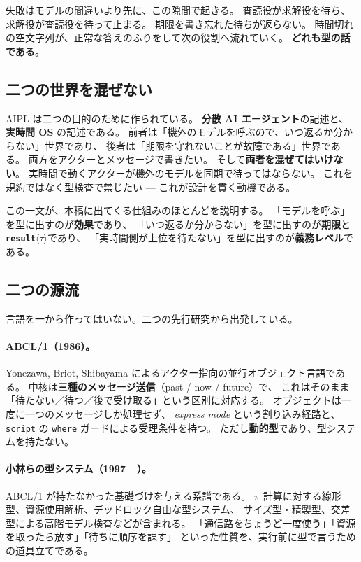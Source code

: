 \documentclass[11pt,a4paper]{ltjsarticle}
\theoremstyle{definition}
\theoremstyle{remark}
\begin{document}
失敗はモデルの間違いより先に、この隙間で起きる。
査読役が求解役を待ち、求解役が査読役を待って止まる。
期限を書き忘れた待ちが返らない。
時間切れの空文字列が、正常な答えのふりをして次の役割へ流れていく。
\textbf{どれも型の話である}。

\subsection{二つの世界を混ぜない}

AIPL は二つの目的のために作られている。
\textbf{分散 AI エージェント}の記述と、\textbf{実時間 OS} の記述である。
前者は「機外のモデルを呼ぶので、いつ返るか分からない」世界であり、
後者は「期限を守れないことが故障である」世界である。
両方をアクターとメッセージで書きたい。
そして\textbf{両者を混ぜてはいけない}。
実時間で動くアクターが機外のモデルを同期で待ってはならない。
これを規約ではなく型検査で禁じたい --- これが設計を貫く動機である。

この一文が、本稿に出てくる仕組みのほとんどを説明する。
「モデルを呼ぶ」を型に出すのが\textbf{効果}であり、
「いつ返るか分からない」を型に出すのが\textbf{期限}と
\textbf{\texttt{result}$\langle\tau\rangle$}であり、
「実時間側が上位を待たない」を型に出すのが\textbf{義務レベル}である。

\subsection{二つの源流}

言語を一から作ってはいない。二つの先行研究から出発している。

\paragraph{ABCL/1（1986）。}
Yonezawa, Briot, Shibayama によるアクター指向の並行オブジェクト言語である。
中核は\textbf{三種のメッセージ送信}（past / now / future）で、
これはそのまま「待たない／待つ／後で受け取る」という区別に対応する。
オブジェクトは一度に一つのメッセージしか処理せず、
\textit{express mode} という割り込み経路と、
\texttt{script} の \texttt{where} ガードによる受理条件を持つ。
ただし\textbf{動的型}であり、型システムを持たない。

\paragraph{小林らの型システム（1997---）。}
ABCL/1 が持たなかった基礎づけを与える系譜である。
$\pi$ 計算に対する線形型、資源使用解析、デッドロック自由な型システム、
サイズ型・精製型、交差型による高階モデル検査などが含まれる。
「通信路をちょうど一度使う」「資源を取ったら放す」「待ちに順序を課す」
といった性質を、実行前に型で言うための道具立てである。
\end{document}
